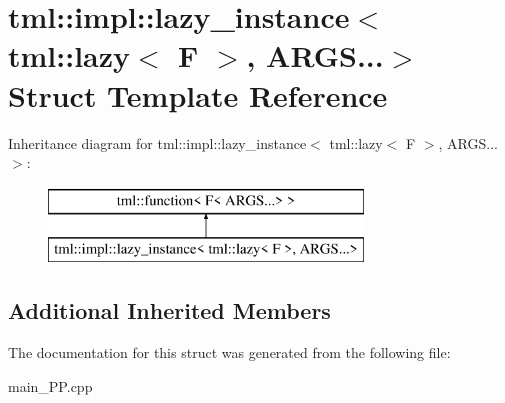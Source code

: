 \hypertarget{structtml_1_1impl_1_1lazy__instance_3_01tml_1_1lazy_3_01F_01_4_00_01ARGS_8_8_8_4}{\section{tml\+:\+:impl\+:\+:lazy\+\_\+instance$<$ tml\+:\+:lazy$<$ F $>$, A\+R\+G\+S...$>$ Struct Template Reference}
\label{structtml_1_1impl_1_1lazy__instance_3_01tml_1_1lazy_3_01F_01_4_00_01ARGS_8_8_8_4}
}
Inheritance diagram for tml\+:\+:impl\+:\+:lazy\+\_\+instance$<$ tml\+:\+:lazy$<$ F $>$, A\+R\+G\+S...$>$\+:\begin{figure}[H]
\begin{center}
\leavevmode
\includegraphics[height=2.000000cm]{structtml_1_1impl_1_1lazy__instance_3_01tml_1_1lazy_3_01F_01_4_00_01ARGS_8_8_8_4}
\end{center}
\end{figure}
\subsection*{Additional Inherited Members}


The documentation for this struct was generated from the following file\+:\begin{DoxyCompactItemize}
\item 
main\+\_\+\+P\+P.\+cpp\end{DoxyCompactItemize}
